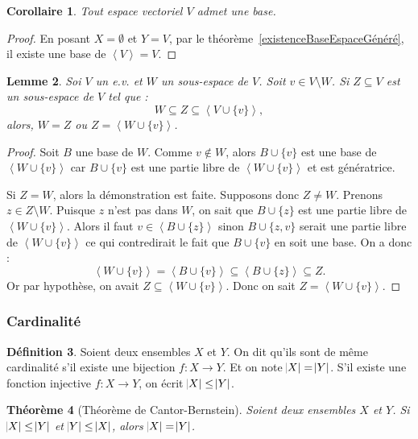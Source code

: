 \documentclass{article}
\newcommand{\eng}[1]{\left\langle#1\right\rangle}
\newtheorem{thm}{Théorème}[section]
\newtheorem{cor}[thm]{Corollaire}
\newtheorem{lem}[thm]{Lemme}
\theoremstyle{definition}
\newtheorem{déf}[thm]{Définition}
\theoremstyle{remark}
\begin{document}
		\begin{cor} Tout espace vectoriel $V$ admet une base. \end{cor}

		\begin{proof} En posant $X = \emptyset$ et $Y = V$, par le théorème~\ref{existenceBaseEspaceGénéré}, il existe une base de $\eng V = V$. \end{proof}

		\begin{lem}\label{identitéSousEspaceInclus} Soi $V$ un e.v. et $W$ un sous-espace de $V$. Soit $v \in V \setminus W$. Si $Z \subseteq V$ est un sous-espace de
		$V$ tel que : \[W \subseteq Z \subseteq \eng {V \cup \{v\}},\] alors, $W = Z$ ou $Z = \eng {W \cup \{v\}}$. \end{lem}

		\begin{proof} Soit $B$ une base de $W$. Comme $v \not \in W$, alors $B \cup \{v\}$ est une base de $\eng {W \cup \{v\}}$ car $B \cup \{v\}$ est une partie libre
		de $\eng {W \cup \{v\}}$ et est génératrice. 
		
		Si $Z = W$, alors la démonstration est faite. Supposons donc $Z \neq W$. Prenons $z \in Z \setminus W$. Puisque $z$ n'est pas dans $W$, on sait que $B \cup \{z\}$
		est une partie libre de $\eng {W \cup \{v\}}$. Alors il faut $v \in \eng {B \cup \{z\}}$ sinon $B \cup \{z, v\}$ serait une partie libre de $\eng {W \cup \{v\}}$ ce qui
		contredirait le fait que $B \cup \{v\}$ en soit une base. On a donc : \[\eng {W \cup \{v\}} = \eng {B \cup \{v\}} \subseteq \eng {B \cup \{z\}} \subseteq Z.\]
		Or par hypothèse, on avait $Z \subseteq \eng {W \cup \{v\}}$. Donc on sait $Z = \eng {W \cup \{v\}}$. \end{proof}
	
		\subsubsection{Cardinalité}
		\begin{déf} Soient deux ensembles $X$ et $Y$. On dit qu'ils sont de même cardinalité s'il existe une bijection $f : X \to Y$. Et on note $\abs X = \abs Y$.
		S'il existe une fonction injective $f : X \to Y$, on écrit $\abs X \leq \abs Y$. \end{déf}

		\begin{thm}[Théorème de Cantor-Bernstein]\label{Cantor-Bernstein} Soient deux ensembles $X$ et $Y$. Si $\abs X \leq \abs Y$ et $\abs Y \leq \abs X$,
		alors $\abs X = \abs Y$. \end{thm}
\end{document}
